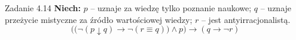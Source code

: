 \documentclass[12pt]{beamer}
\begin{document}
\begin{frame}{Zadanie 4.14}
\textbf{Niech:} $p$ -- uznaje za wiedzę tylko poznanie naukowe; $q$ -- uznaje przeżycie mistyczne za źródło wartościowej wiedzy; $r$ -- jest antyirracjonalistą.
\vspace{10pt}
\[ \Big(\big(\neg(p \downarrow q) \rightarrow \neg(r \equiv q)\big) \wedge p\Big) \rightarrow (q \rightarrow \neg r) \]
\end{frame}
\end{document}
